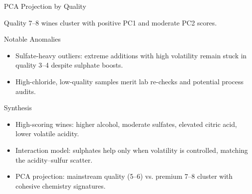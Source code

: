\documentclass[aspectratio=169]{beamer}
\begin{document}
\begin{frame}{PCA Projection by Quality}
  \begin{center}
  \end{center}
  \vspace{-0.4em}
  \centering\small Quality 7--8 wines cluster with positive PC1 and moderate PC2 scores.
\end{frame}

\begin{frame}{Notable Anomalies}
  \begin{itemize}
    \item Sulfate-heavy outliers: extreme additions with high volatility remain stuck in quality 3--4 despite sulphate boosts.
    \item High-chloride, low-quality samples merit lab re-checks and potential process audits.
  \end{itemize}
\end{frame}

\begin{frame}{Synthesis}
  \begin{itemize}
    \item High-scoring wines: higher alcohol, moderate sulfates, elevated citric acid, lower volatile acidity.
    \item Interaction model: sulphates help only when volatility is controlled, matching the acidity--sulfur scatter.
    \item PCA projection: mainstream quality (5--6) vs. premium 7--8 cluster with cohesive chemistry signatures.
  \end{itemize}
\end{frame}
\end{document}
